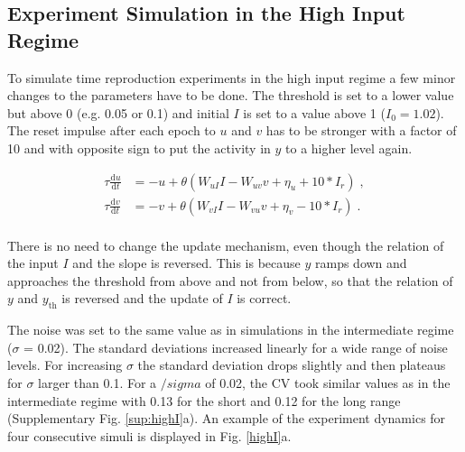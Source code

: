 \documentclass[10pt]{article}
\begin{document}
\subsection{Experiment Simulation in the High Input Regime}
To simulate time reproduction experiments in the high input regime a few minor changes to the parameters have to be done. 
The threshold is set to a lower value but above 0 (e.g. 0.05 or 0.1) and initial $I$ is set to a value above 1 ($I_0 = 1.02$). The reset impulse after each epoch to $u$ and $v$ has to be stronger with a factor of 10 and with opposite sign to put the activity in $y$ to a higher level again.  

\begin{equation} \label{highI}
	\begin{split}
	\tau\frac{\text{d}u}{\text{d}t} & = -u + \theta(W_{uI}I - W_{uv}v + \eta_u + 10*I_r) \;,\\
	\tau\frac{\text{d}v}{\text{d}t} & = -v + \theta(W_{vI}I - W_{vu}v + \eta_v - 10*I_r) \;.\\
	\end{split}
\end{equation}

There is no need to change the update mechanism, even though the relation of the input $I$ and the slope is reversed. This is because $y$ ramps down and approaches the threshold from above and not from below, so that the relation of $y$ and $y_{\text{th}}$ is reversed and the update of $I$ is correct. 

The noise was set to the same value as in simulations in the intermediate regime ($\sigma$ = 0.02). The standard deviations increased linearly for a wide range of noise levels. For increasing $\sigma$ the standard deviation drops slightly and then plateaus for $\sigma$ larger than 0.1. For a $/sigma$ of 0.02, the CV took similar values as in the intermediate regime with 0.13 for the short and 0.12 for the long range (Supplementary Fig. \ref{sup:highI}a). 
An example of the experiment dynamics for four consecutive simuli is displayed in Fig. \ref{highI}a.
\end{document}
